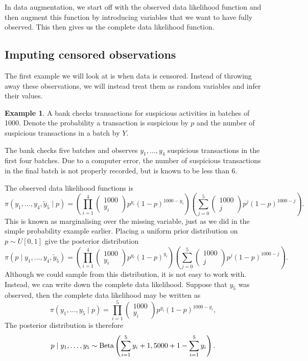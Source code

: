 \documentclass[
]{book}
\theoremstyle{definition}
\theoremstyle{definition}
\newtheorem{example}{Example}[chapter]
\theoremstyle{definition}
\theoremstyle{definition}
\theoremstyle{remark}
\begin{document}
In data augmentation, we start off with the observed data likelihood function and then augment this function by introducing variables that we want to have fully observed. This then gives us the complete data likelihood function.

\hypertarget{imputing-censored-observations}{%
\subsection{Imputing censored observations}\label{imputing-censored-observations}}

The first example we will look at is when data is censored. Instead of throwing away these observations, we will instead treat them as random variables and infer their values.

\begin{example}
A bank checks transactions for suspicious activities in batches of 1000. Denote the probability a transaction is suspicious by \(p\) and the number of suspicious transactions in a batch by \(Y\).

The bank checks five batches and observes \(y_1, \ldots, y_4\) suspicious transactions in the first four batches. Due to a computer error, the number of suspicious transactions in the final batch is not properly recorded, but is known to be less than 6.

The observed data likelihood functions is
\[
\pi(y_1, \ldots, y_4, \tilde{y}_5 \mid p) = \left(\prod_{i=1}^4\begin{pmatrix} 1000 \\ y_i \end{pmatrix} p^{y_i}(1-p)^{1000 - y_i} \right)\left(\sum_{j=0}^5\begin{pmatrix} 1000 \\ j \end{pmatrix} p^{j}(1-p)^{1000 - j}\right).
\]
This is known as marginalising over the missing variable, just as we did in the simple probability example earlier. Placing a uniform prior distribution on \(p \sim U[0, 1]\) give the posterior distribution
\[
\pi(p \mid y_1, \ldots, y_4, \tilde{y}_5)= \left(\prod_{i=1}^4\begin{pmatrix} 1000 \\ y_i \end{pmatrix} p^{y_i}(1-p)^{y_i} \right)\left(\sum_{j=0}^5\begin{pmatrix} 1000 \\ j \end{pmatrix} p^{j}(1-p)^{1000 - j}\right).
\]
Although we could sample from this distribution, it is not easy to work with. Instead, we can write down the complete data likelihood. Suppose that \(y_5\) was observed, then the complete data likelihood may be written as
\[
\pi(y_1, \ldots, y_5 \mid p)  = \prod_{i=1}^5\begin{pmatrix} 1000 \\ y_i \end{pmatrix} p^{y_i}(1-p)^{1000 - y_i},
\]
The posterior distribution is therefore
\[
p \mid y_1, \ldots, y_5 \sim \hbox{Beta}\left(\sum_{i=1}^5 y_i + 1, 5000 + 1 - \sum_{i=1}^5 y_i\right).
\]


\end{example}
\end{document}
